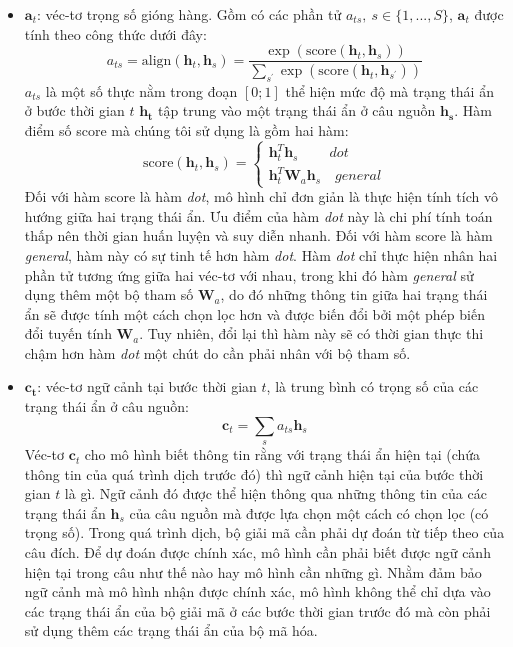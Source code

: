 \begin{itemize}
	\item $\bm{a}_t$: véc-tơ trọng số gióng hàng. Gồm có các phần tử $a_{ts},\ s \in \{1, ..., S\}$, $\bm{a}_t$ được tính theo công thức dưới đây:
	\begin{equation}
	a_{ts} = \text{align}(\bm{h}_t, \bm{h}_s) = \frac{\exp\left(\text{score}(\bm{h}_t, \bm{h}_s)\right)}{\sum_{s^{'}}\exp\left(\text{score}(\bm{h}_t, \bm{h}_{s^{'}})\right)}
	\end{equation}
	$a_{ts}$ là một số thực nằm trong đoạn $[0;1]$ thể hiện mức độ mà trạng thái ẩn ở bước thời gian $t$ $\bm{h_t}$ tập trung vào một trạng thái ẩn ở câu nguồn $\bm{h_s}$. Hàm điểm số score mà chúng tôi sử dụng là gồm hai hàm:
	\begin{equation}
	\text{score}(\bm{h}_t, \bm{h}_s) = \left\{
			\begin{array}{ll}
			\bm{h}^T_t \bm{h}_s \ \quad\quad dot\\
			\bm{h}^T_t \bm{W}_a \bm{h}_s	\quad general
			\end{array}
		\right.
	\end{equation}
	Đối với hàm score là hàm \textit{dot}, mô hình chỉ đơn giản là thực hiện tính tích vô hướng giữa hai trạng thái ẩn. Ưu điểm của hàm \textit{dot} này là chi phí tính toán thấp nên thời gian huấn luyện và suy diễn nhanh.
	Đối với hàm score là hàm \textit{general}, hàm này có sự tinh tế hơn hàm \textit{dot}. Hàm \textit{dot} chỉ thực hiện nhân hai phần tử tương ứng giữa hai véc-tơ với nhau, trong khi đó hàm \textit{general} sử dụng thêm một bộ tham số $\bm{W}_a$, do đó những thông tin giữa hai trạng thái ẩn sẽ được tính một cách chọn lọc hơn và được biến đổi bởi một phép biến đổi tuyến tính $\bm{W}_a$. Tuy nhiên, đổi lại thì hàm này sẽ có thời gian thực thi chậm hơn hàm \textit{dot} một chút do cần phải nhân với bộ tham số.
	\item $\bm{c_t}$: véc-tơ ngữ cảnh tại bước thời gian $t$, là trung bình có trọng số của các trạng thái ẩn ở câu nguồn:
	\begin{equation}
	\bm{c}_t = \sum_{s}a_{ts}\bm{h}_s
	\end{equation}
	Véc-tơ $\bm{c}_t$ cho mô hình biết thông tin rằng với trạng thái ẩn hiện tại (chứa thông tin của quá trình dịch trước đó) thì ngữ cảnh hiện tại của bước thời gian $t$ là gì. Ngữ cảnh đó được thể hiện thông qua những thông tin của các trạng thái ẩn $\bm{h}_s$ của câu nguồn mà được lựa chọn một cách có chọn lọc (có trọng số). Trong quá trình dịch, bộ giải mã cần phải dự đoán từ tiếp theo của câu đích. Để dự đoán được chính xác, mô hình cần phải biết được ngữ cảnh hiện tại trong câu như thế nào hay mô hình cần những gì. Nhằm đảm bảo ngữ cảnh mà mô hình nhận được chính xác, mô hình không thể chỉ dựa vào các trạng thái ẩn của bộ giải mã ở các bước thời gian trước đó mà còn phải sử dụng thêm các trạng thái ẩn của bộ mã hóa.

\end{itemize}
